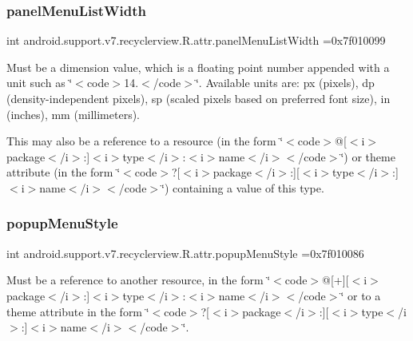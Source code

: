 \subsubsection{\texorpdfstring{panel\+Menu\+List\+Width}{panelMenuListWidth}}
{\footnotesize\ttfamily int android.\+support.\+v7.\+recyclerview.\+R.\+attr.\+panel\+Menu\+List\+Width =0x7f010099\hspace{0.3cm}{\ttfamily [static]}}

Must be a dimension value, which is a floating point number appended with a unit such as \char`\"{}$<$code$>$14.\+5sp$<$/code$>$\char`\"{}. Available units are\+: px (pixels), dp (density-\/independent pixels), sp (scaled pixels based on preferred font size), in (inches), mm (millimeters). 

This may also be a reference to a resource (in the form \char`\"{}$<$code$>$@\mbox{[}$<$i$>$package$<$/i$>$\+:\mbox{]}$<$i$>$type$<$/i$>$\+:$<$i$>$name$<$/i$>$$<$/code$>$\char`\"{}) or theme attribute (in the form \char`\"{}$<$code$>$?\mbox{[}$<$i$>$package$<$/i$>$\+:\mbox{]}\mbox{[}$<$i$>$type$<$/i$>$\+:\mbox{]}$<$i$>$name$<$/i$>$$<$/code$>$\char`\"{}) containing a value of this type. \mbox{\label{classandroid_1_1support_1_1v7_1_1recyclerview_1_1R_1_1attr_a7c76c1fbc081d9dcd3fe90305c7cb351}} 
\subsubsection{\texorpdfstring{popup\+Menu\+Style}{popupMenuStyle}}
{\footnotesize\ttfamily int android.\+support.\+v7.\+recyclerview.\+R.\+attr.\+popup\+Menu\+Style =0x7f010086\hspace{0.3cm}{\ttfamily [static]}}

Must be a reference to another resource, in the form \char`\"{}$<$code$>$@\mbox{[}+\mbox{]}\mbox{[}$<$i$>$package$<$/i$>$\+:\mbox{]}$<$i$>$type$<$/i$>$\+:$<$i$>$name$<$/i$>$$<$/code$>$\char`\"{} or to a theme attribute in the form \char`\"{}$<$code$>$?\mbox{[}$<$i$>$package$<$/i$>$\+:\mbox{]}\mbox{[}$<$i$>$type$<$/i$>$\+:\mbox{]}$<$i$>$name$<$/i$>$$<$/code$>$\char`\"{}. \mbox{\label{classandroid_1_1support_1_1v7_1_1recyclerview_1_1R_1_1attr_af26e858c5bcefd37bb6149e8c47e86cf}} 
